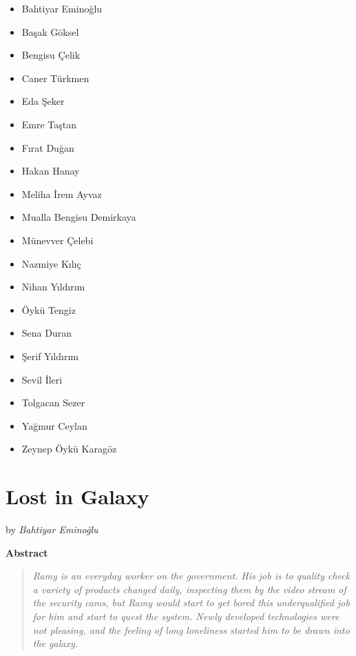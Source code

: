\documentclass[]{book}
\providecommand{\tightlist}{%
  \setlength{\itemsep}{0pt}\setlength{\parskip}{0pt}}
\begin{document}
\begin{itemize}
\tightlist
\item
  Bahtiyar Eminoğlu
\item
  Başak Göksel
\item
  Bengisu Çelik
\item
  Caner Türkmen
\item
  Eda Şeker
\item
  Emre Taştan
\item
  Fırat Duğan
\item
  Hakan Hanay
\item
  Meliha İrem Ayvaz
\item
  Mualla Bengisu Demirkaya
\item
  Münevver Çelebi
\item
  Nazmiye Kılıç
\item
  Nihan Yıldırım
\item
  Öykü Tengiz
\item
  Sena Duran
\item
  Şerif Yıldırım
\item
  Sevil İleri
\item
  Tolgacan Sezer
\item
  Yağmur Ceylan
\item
  Zeynep Öykü Karagöz
\end{itemize}

\hypertarget{lost-in-galaxy}{%
\chapter{Lost in Galaxy}\label{lost-in-galaxy}}

by \emph{Bahtiyar Eminoğlu}

\textbf{Abstract}

\begin{quote}
\emph{Ramy is an everyday worker on the government. His job is to quality check a variety of products changed daily, inspecting them by the video stream of the security cams, but Ramy would start to get bored this underqualified job for him and start to quest the system. Newly developed technologies were not pleasing, and the feeling of long loneliness started him to be drawn into the galaxy.}
\end{quote}
\end{document}
